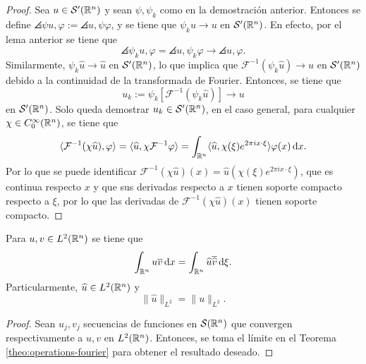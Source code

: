 \begin{proof}
	Sea $u\in\mathcal{S}'(\mathbb{R}^n)$ y sean $\psi,\psi_k$ como en la demostración anterior. Entonces se define $\angles{\psi u, \varphi} := \angles{u, \psi\varphi}$, y se tiene que $\psi_ku\rightarrow u$ en $\mathcal{S}'(\mathbb{R}^n)$. En efecto, por el lema anterior se tiene que
	\begin{equation*}
		\angles{\psi_k u, \varphi} = \angles{u, \psi_k\varphi} \rightarrow \angles{u, \varphi}.
	\end{equation*}
	Similarmente, $\psi_k\widehat{u}\rightarrow\widehat{u}$ en $\mathcal{S}'(\mathbb{R}^n)$, lo que implica que $\mathcal{F}^{-1}(\psi_k\widehat{u})\rightarrow u$ en $\mathcal{S}'(\mathbb{R}^n)$ debido a la continuidad de la transformada de Fourier. Entonces, se tiene que 
	\begin{equation*}
		u_k := \psi_k [\mathcal{F}^{-1}(\psi_k\widehat{u}) ]\rightarrow u
	\end{equation*}
	en $\mathcal{S}'(\mathbb{R}^n)$. Solo queda demostrar $u_k\in\mathcal{S}'(\mathbb{R}^n)$, en el caso general, para cualquier $\chi\in C^\infty_0(\mathbb{R}^n)$, se tiene que 
	\begin{equation*}
		\langle\mathcal{F}^{-1}(\chi \widehat{u}), \varphi\rangle  = 
		\langle\widehat{u}, \chi\mathcal{F}^{-1}\varphi\rangle 
		 = \int_{\mathbb{R}^n} \langle\widehat{u},\chi(\xi) e^{2\pi i x\cdot\xi}\rangle\varphi(x) \mathop{}\!\mathrm{d} x.
	\end{equation*}
	Por lo que se puede identificar $\mathcal{F}^{-1}(\chi \widehat{u})(x) = \widehat{u}(\chi(\xi)e^{2\pi ix\cdot\xi})$, que es continua respecto $x$ y que sus derivadas respecto a $x$ tienen soporte compacto respecto a $\xi$, por lo que las derivadas de $\mathcal{F}^{-1}(\chi \widehat{u})(x)$ tienen soporte compacto.
\end{proof}
\begin{theorem}
	Para $u,v\in L^2(\mathbb{R}^n) $ se tiene que 
	\begin{equation*}
		\int_{\mathbb{R}^n}u\overline{v}\mathop{}\!\mathrm{d} x = \int_{\mathbb{R}^n}\widehat{u}\overline{\widehat{v}}\mathop{}\!\mathrm{d} \xi.
	\end{equation*}
	Particularmente, $\widehat{u}\in L^2(\mathbb{R}^n)$ y 
	\begin{equation*}
		\|\widehat{u}\|_{L^2} = \|u\|_{L^2}.
	\end{equation*} 
\end{theorem}
\begin{proof}
	Sean $u_j, v_j$ secuencias de funciones en $\mathcal{S}(\mathbb{R}^n)$ que convergen respectivamente a $u, v$ en $L^2(\mathbb{R}^n)$. Entonces, se toma el límite en el Teorema \ref{theo:operations-fourier} para obtener el resultado deseado.
\end{proof}
